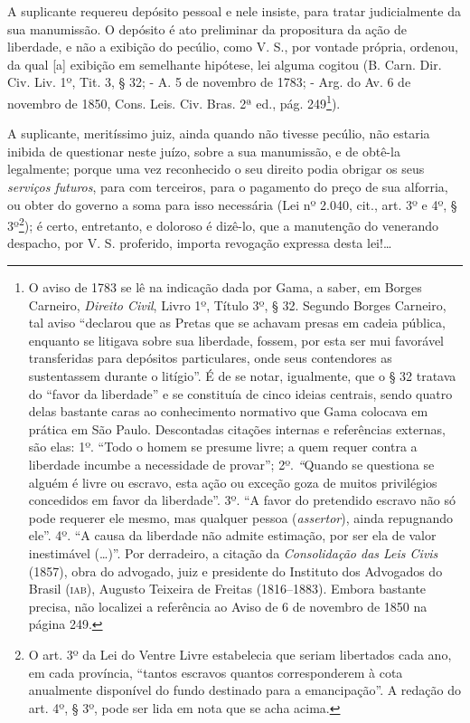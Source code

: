 {\begin{flushright}
A suplicante requereu depósito pessoal e nele insiste, para tratar
judicialmente da sua manumissão. O depósito é ato preliminar da
propositura da ação de liberdade, e não a exibição do pecúlio, como V.
S., por vontade própria, ordenou, da qual {[}a{]} exibição em semelhante
hipótese, lei alguma cogitou (B. Carn. Dir. Civ. Liv. 1º, Tit. 3, § 32;
- A. 5 de novembro de 1783; - Arg. do Av. 6 de novembro de 1850, Cons.
Leis. Civ. Bras. 2ª ed., pág. 249\footnote{ O aviso de 1783 se lê na
  indicação dada por Gama, a saber, em Borges Carneiro, \emph{Direito
  Civil}, Livro 1º, Título 3º, § 32. Segundo Borges Carneiro, tal aviso
  ``declarou que as Pretas que se achavam presas em cadeia pública,
  enquanto se litigava sobre sua liberdade, fossem, por esta ser mui
  favorável transferidas para depósitos particulares, onde seus
  contendores as sustentassem durante o litígio''. É de se notar,
  igualmente, que o § 32 tratava do ``favor da liberdade'' e se constituía
  de cinco ideias centrais, sendo quatro delas bastante caras ao
  conhecimento normativo que Gama colocava em prática em São Paulo.
  Descontadas citações internas e referências externas, são elas: 1º.
  ``Todo o homem se presume livre; a quem requer contra a liberdade
  incumbe a necessidade de provar''; 2º. \emph{``}Quando se questiona se
  alguém é livre ou escravo, esta ação ou exceção goza de muitos
  privilégios concedidos em favor da liberdade''. 3º. ``A favor do
  pretendido escravo não só pode requerer ele mesmo, mas qualquer pessoa
  (\emph{assertor}), ainda repugnando ele''. 4º. ``A causa da liberdade
  não admite estimação, por ser ela de valor inestimável (\ldots{})''. Por
  derradeiro, a citação da \emph{Consolidação das Leis Civis} (1857),
  obra do advogado, juiz e presidente do Instituto dos Advogados do
  Brasil (\textsc{iab}), Augusto Teixeira de Freitas (1816--1883). Embora bastante
  precisa, não localizei a referência ao Aviso de 6 de novembro de 1850
  na página 249.}).

A suplicante, meritíssimo juiz, ainda quando não tivesse pecúlio, não
estaria inibida de questionar neste juízo, sobre a sua manumissão, e de
obtê-la legalmente; porque uma vez reconhecido o seu direito podia
obrigar os seus \emph{serviços futuros}, para com terceiros, para o
pagamento do preço de sua alforria, ou obter do governo a soma para isso
necessária (Lei nº 2.040, cit., art. 3º e 4º, § 3º\footnote{ O art. 3º
  da Lei do Ventre Livre estabelecia que seriam libertados cada ano, em
  cada província, ``tantos escravos quantos corresponderem à cota
  anualmente disponível do fundo destinado para a emancipação''. A
  redação do art. 4º, § 3º, pode ser lida em nota que se acha acima.});
é certo, entretanto, e doloroso é dizê-lo, que a manutenção do venerando
despacho, por V. S. proferido, importa revogação expressa desta lei!\ldots{}


\end{flushright}}
